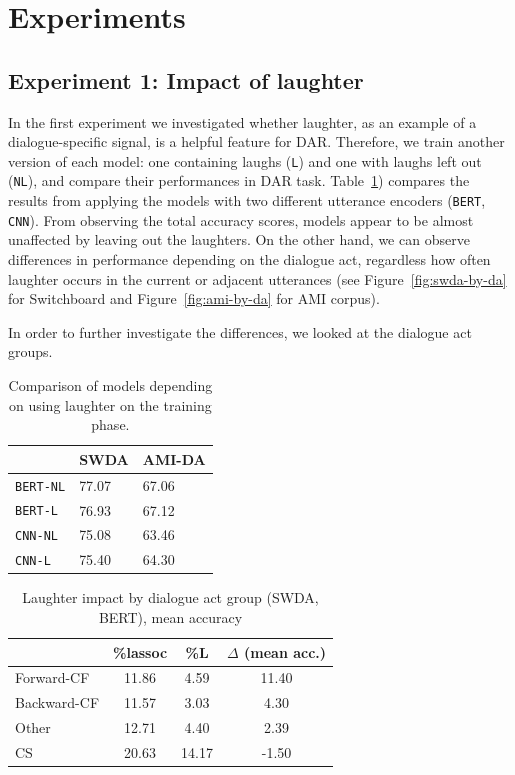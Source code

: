 \documentclass[11pt,a4paper]{article}
\begin{document}
\section{Experiments}
\subsection{Experiment 1: Impact of laughter} \label{sec:experiment1}   %
In the first experiment we investigated whether laughter, as an example of a dialogue-specific signal, is a helpful feature for DAR.
Therefore, we train another version of each model: one containing laughs (\texttt{L}) and one with laughs left out (\texttt{NL}), and compare their performances in DAR task.
Table~\ref{table:laughter-total-acc}) compares the results from applying the models with two different utterance encoders (\texttt{BERT}, \texttt{CNN}). From observing the total accuracy scores, models appear to be almost unaffected by leaving out the laughters. On the other hand, we can observe differences in performance depending on the dialogue act, regardless how often laughter occurs in the current or adjacent utterances (see Figure~\ref{fig:swda-by-da} for Switchboard and Figure~\ref{fig:ami-by-da} for AMI corpus).

In order to further investigate the differences, we looked at the dialogue act groups.
\begin{table}
  \centering
  \begin{tabular}{@{}lll@{}}
    \toprule
                      & SWDA  & AMI-DA   \\ \midrule
    \texttt{BERT-NL}  & 77.07 & 67.06       \\ 
    \texttt{BERT-L}   & 76.93 & 67.12       \\ \midrule
    \texttt{CNN-NL}   & 75.08 & 63.46        \\
    \texttt{CNN-L}    & 75.40 & 64.30        \\ \bottomrule
    
  \end{tabular}
  \caption{Comparison of models depending on using laughter on the training phase. }
  \label{table:laughter-total-acc}
\end{table}

\begin{table}
  \label{tab:laughter}
  \centering
  \begin{tabular}{@{}lccc@{}}
    \toprule
    & \%lassoc & \%L  & $\Delta$ (mean acc.) \\ \midrule
    Forward-CF & 11.86 & 4.59 & 11.40\\
    Backward-CF & 11.57 & 3.03 & 4.30\\
    Other & 12.71 & 4.40 & 2.39\\
    CS & 20.63 & 14.17 & -1.50\\\bottomrule
    
  \end{tabular}
  \caption{Laughter impact by dialogue act group (SWDA, BERT), mean accuracy}
\end{table}
\end{document}
